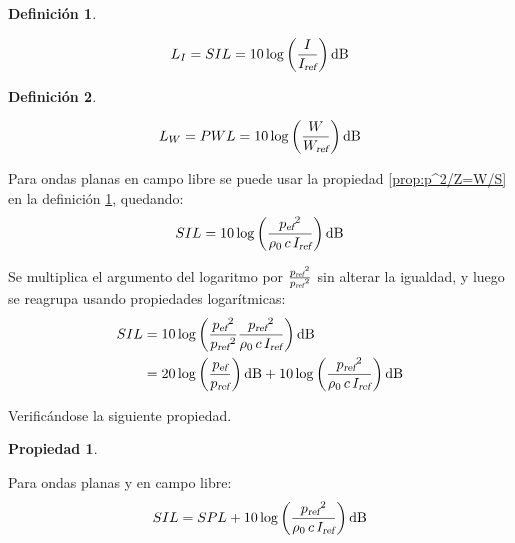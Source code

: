 \documentclass[a5paper,12pt,twoside]{book}
\newtheorem{defn}{{Definición}}[chapter]
\newtheorem{prop}{{Propiedad}}[chapter]
\begin{document}
\begin{mdframed}[style=DefinitionFrame]
    \begin{defn}
        \label{defn:SIL}
    \end{defn}
    \begin{equation*}
        L_I = SIL = 10 \log \left( \frac{I}{\sub{I}{ref}} \right)\si{\deci\bel}
    \end{equation*}
\end{mdframed}

\begin{mdframed}[style=DefinitionFrame]
    \begin{defn}
        \label{defn:PWL}
    \end{defn}
    \begin{equation*}
        L_W = PWL = 10 \log \left( \frac{W}{\sub{W}{ref}} \right)\si{\deci\bel}
    \end{equation*}
\end{mdframed}

Para ondas planas en campo libre se puede usar la propiedad \ref{prop:p^2/Z=W/S} en la definición \ref{defn:SIL}, quedando:
\begin{equation*}
    SIL = 10 \log \left( \frac{\rms{p}^2}{\rho_0 \, c \, \sub{I}{ref}} \right) \si{\deci\bel}
\end{equation*}

Se multiplica el argumento del logaritmo por $\tfrac{{{p}_\textsl{{ref}}}^2}{{{p}_\textsl{{ref}}}^2}$ sin alterar la igualdad, y luego se reagrupa usando propiedades logarítmicas:
\begin{align*}
    SIL &= 10 \log \left( \frac{\rms{p}^2}{\sub{p}{ref}^2} \frac{\sub{p}{ref}^2}{\rho_0 \, c \, \sub{I}{ref}} \right) \si{\deci\bel}
    \\
    &= 20 \log \left( \frac{\rms{p}}{\sub{p}{ref}} \right) \si{\deci\bel} + 10 \log \left( \frac{\sub{p}{ref}^2}{\rho_0 \, c \, \sub{I}{ref}} \right) \si{\deci\bel}
\end{align*}

Verificándose la siguiente propiedad.

\begin{mdframed}[style=PropertyFrame]
    \begin{prop}
    \end{prop}
    Para ondas planas y en campo libre:
    \begin{equation*}
        SIL = SPL + 10 \log \left( \frac{\sub{p}{ref}^2}{\rho_0 \, c \, \sub{I}{ref}} \right) \si{\deci\bel}
    \end{equation*}
\end{mdframed}
\end{document}
